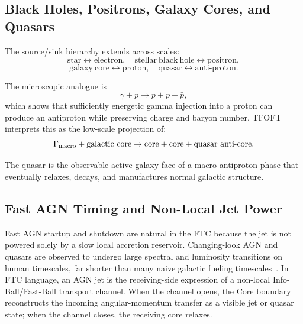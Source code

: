 \documentclass[11pt,a4paper]{article}
\begin{document}
\subsection{Black Holes, Positrons, Galaxy Cores, and Quasars}

The source/sink hierarchy extends across scales:
\begin{equation}
\mathrm{star} \leftrightarrow \mathrm{electron},\quad
\mathrm{stellar\ black\ hole} \leftrightarrow \mathrm{positron},
\end{equation}
\begin{equation}
\mathrm{galaxy\ core} \leftrightarrow \mathrm{proton},\quad
\mathrm{quasar} \leftrightarrow \mathrm{anti\mbox{-}proton}.
\end{equation}

The microscopic analogue is
\begin{equation}
\gamma+p\rightarrow p+p+\bar p,
\end{equation}
which shows that sufficiently energetic gamma injection into a proton can
produce an antiproton while preserving charge and baryon number. TFOFT
interprets this as the low-scale projection of:
\begin{equation}
\Gamma_{\rm macro}
+
\mathrm{galactic\ core}
\rightarrow
\mathrm{core}
+
\mathrm{core}
+
\mathrm{quasar\ anti\mbox{-}core}.
\end{equation}

The quasar is the observable active-galaxy face of a macro-antiproton phase that eventually relaxes, decays, and manufactures normal galactic structure.

\subsection{Fast AGN Timing and Non-Local Jet Power}
\label{sec:agn_nonlocal_jets}

Fast AGN startup and shutdown are natural in the FTC because the jet is not powered solely by a slow local accretion reservoir. Changing-look AGN and quasars are observed to undergo large spectral and luminosity transitions on human timescales, far shorter than many naive galactic fueling timescales~\cite{Ruan2016,Ricci2023,Yang2025}. In FTC language, an AGN jet is the receiving-side expression of a non-local Info-Ball/Fast-Ball transport channel. When the channel opens, the Core boundary reconstructs the incoming angular-momentum transfer as a visible jet or quasar state; when the channel closes, the receiving core relaxes.
\end{document}

